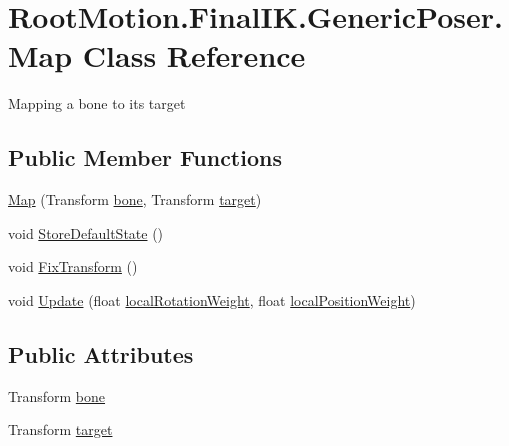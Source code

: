 \hypertarget{class_root_motion_1_1_final_i_k_1_1_generic_poser_1_1_map}{}\section{Root\+Motion.\+Final\+I\+K.\+Generic\+Poser.\+Map Class Reference}
\label{class_root_motion_1_1_final_i_k_1_1_generic_poser_1_1_map}


Mapping a bone to it\textquotesingle{}s target  


\subsection*{Public Member Functions}
\begin{DoxyCompactItemize}
\item 
\mbox{\hyperlink{class_root_motion_1_1_final_i_k_1_1_generic_poser_1_1_map_a358b09c61e7344530c68c70a4e171705}{Map}} (Transform \mbox{\hyperlink{class_root_motion_1_1_final_i_k_1_1_generic_poser_1_1_map_aa440fa328fe60e698b6cf7a632dca63e}{bone}}, Transform \mbox{\hyperlink{class_root_motion_1_1_final_i_k_1_1_generic_poser_1_1_map_acfca6df931850f706e9c7dc2139cc50c}{target}})
\item 
void \mbox{\hyperlink{class_root_motion_1_1_final_i_k_1_1_generic_poser_1_1_map_a80b0e8681807b861651f480615384e79}{Store\+Default\+State}} ()
\item 
void \mbox{\hyperlink{class_root_motion_1_1_final_i_k_1_1_generic_poser_1_1_map_abbf8819321cfc224cbaa169a9dd532c2}{Fix\+Transform}} ()
\item 
void \mbox{\hyperlink{class_root_motion_1_1_final_i_k_1_1_generic_poser_1_1_map_a3c544562c9c2a8de9da45890b47081ca}{Update}} (float \mbox{\hyperlink{class_root_motion_1_1_final_i_k_1_1_poser_ab3de4b9258766840623d60d706bfcbf8}{local\+Rotation\+Weight}}, float \mbox{\hyperlink{class_root_motion_1_1_final_i_k_1_1_poser_a11cac4a9c5dc5db9337e94a30202af3a}{local\+Position\+Weight}})
\end{DoxyCompactItemize}
\subsection*{Public Attributes}
\begin{DoxyCompactItemize}
\item 
Transform \mbox{\hyperlink{class_root_motion_1_1_final_i_k_1_1_generic_poser_1_1_map_aa440fa328fe60e698b6cf7a632dca63e}{bone}}
\item 
Transform \mbox{\hyperlink{class_root_motion_1_1_final_i_k_1_1_generic_poser_1_1_map_acfca6df931850f706e9c7dc2139cc50c}{target}}
\end{DoxyCompactItemize}


